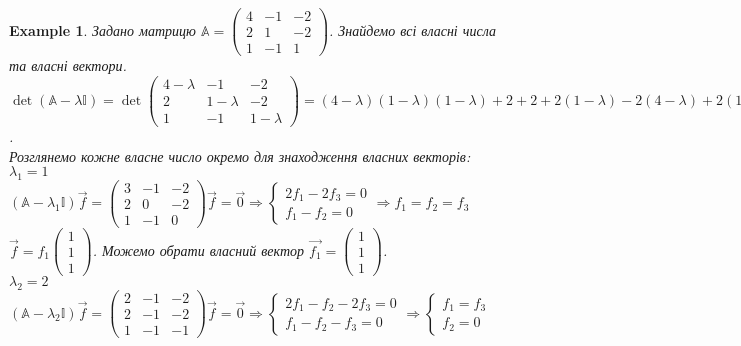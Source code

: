 \documentclass[a4paper, 10pt]{article}
\theoremstyle{theoremdd}
\newtheorem{example}[theorem]{Example}
\begin{document}
\begin{example}
\label{find_eigenvectors}
Задано матрицю $\mathbb{A} = \begin{pmatrix}
4 & -1 & -2 \\
2 & 1 & -2 \\
1 & -1 & 1
\end{pmatrix}$. Знайдемо всі власні числа та власні вектори.\\
$\det (\mathbb{A} - \lambda \mathbb{I}) = \det \begin{pmatrix}
4-\lambda & -1 & -2 \\
2 & 1-\lambda & -2 \\
1 & -1 & 1-\lambda
\end{pmatrix} = (4-\lambda)(1-\lambda)(1-\lambda) + 2 + 2 + 2(1-\lambda) -2(4-\lambda) +2(1-\lambda) = -\lambda^3 + 6 \lambda^2 - 11 \lambda + 6 = 0 \implies (\lambda - 1)(\lambda -2)(\lambda - 3) = 0$.\\
Розглянемо кожне власне число окремо для знаходження власних векторів:\\
$\lambda_1 = 1$\\
$(\mathbb{A} - \lambda_1 \mathbb{I})\vec{f} =\begin{pmatrix}
3 & -1 & -2 \\
2 & 0 & -2 \\
1 & -1 & 0
\end{pmatrix} \vec{f} = \vec{0} \Rightarrow \begin{cases} 2f_1 - 2f_3 = 0 \\ f_1 - f_2 = 0 \end{cases} \Rightarrow f_1 = f_2 = f_3$\\
$\vec{f} = f_1 \begin{pmatrix}
1 \\ 1 \\ 1
\end{pmatrix}$. Можемо обрати власний вектор $\vec{f_1} = \begin{pmatrix}
1 \\ 1 \\ 1
\end{pmatrix}$.
\bigskip \\
$\lambda_2 = 2$\\
$(\mathbb{A} - \lambda_2 \mathbb{I})\vec{f} =\begin{pmatrix}
2 & -1 & -2 \\
2 & -1 & -2 \\
1 & -1 & -1
\end{pmatrix} \vec{f} = \vec{0} \Rightarrow \begin{cases} 2f_1 - f_2 - 2f_3 = 0 \\ f_1 - f_2 - f_3 = 0 \end{cases} \Rightarrow \begin{cases} f_1 = f_3 \\ f_2 = 0 \end{cases}$\\

\end{example}
\end{document}
